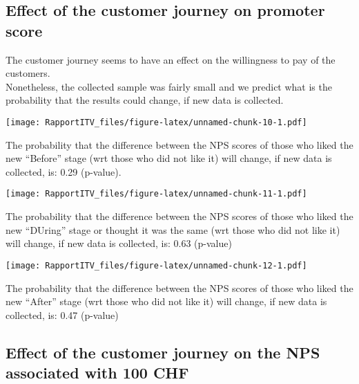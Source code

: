 \documentclass[
]{article}
\begin{document}
\newpage

\hypertarget{effect-of-the-customer-journey-on-promoter-score}{%
\subsection{Effect of the customer journey on promoter
score}\label{effect-of-the-customer-journey-on-promoter-score}}

The customer journey seems to have an effect on the willingness to pay
of the customers.\\
Nonetheless, the collected sample was fairly small and we predict what
is the probability that the results could change, if new data is
collected.

\texttt{[image: RapportITV\_files/figure-latex/unnamed-chunk-10-1.pdf]}

The probability that the difference between the NPS scores of those who
liked the new ``Before'' stage (wrt those who did not like it) will
change, if new data is collected, is: 0.29 (p-value).

\texttt{[image: RapportITV\_files/figure-latex/unnamed-chunk-11-1.pdf]}

The probability that the difference between the NPS scores of those who
liked the new ``DUring'' stage or thought it was the same (wrt those who
did not like it) will change, if new data is collected, is: 0.63
(p-value)

\texttt{[image: RapportITV\_files/figure-latex/unnamed-chunk-12-1.pdf]}

The probability that the difference between the NPS scores of those who
liked the new ``After'' stage (wrt those who did not like it) will
change, if new data is collected, is: 0.47 (p-value)

\hypertarget{effect-of-the-customer-journey-on-the-nps-associated-with-100-chf}{%
\subsection{Effect of the customer journey on the NPS associated with
100
CHF}\label{effect-of-the-customer-journey-on-the-nps-associated-with-100-chf}}
\end{document}
